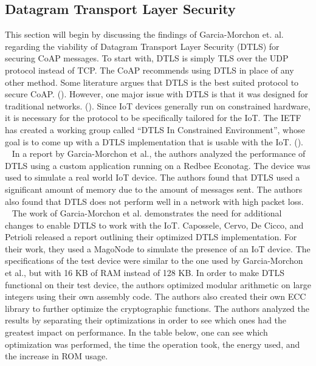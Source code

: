 \documentclass[letterpaper, 12pt]{article}
\begin{document}
\begin{flushleft}
\subsection*{Datagram Transport Layer Security}
This section will begin by discussing the findings of Garcia-Morchon et. al. regarding the viability of Datagram Transport Layer Security (DTLS)
for securing CoAP messages. To start with, DTLS is simply TLS over the UDP protocol instead of TCP. The CoAP recommends using DTLS in place of any
other method. Some literature argues that DTLS is the best suited protocol to secure CoAP. (\cite{Keoh6817545}). However, one major issue with DTLS is that it was designed for traditional networks. (\cite{Capossele}). 
Since IoT devices generally run on constrained hardware, it is necessary for the protocol to be specifically tailored for the IoT.
The IETF has created a working group called ``DTLS In Constrained Environment'', whose goal is to 
come up with a DTLS implementation that is usable with the IoT. (\cite{Keoh6817545}). \\
~\newline
In a report by Garcia-Morchon et al., the authors analyzed the performance of DTLS using a custom application running on a Redbee Econotag. The device
was used to simulate a real world IoT device. The authors found that DTLS used a significant amount of memory due to the amount of messages sent. 
The authors also found that DTLS does not perform well in a network with high packet loss. \\
~\newline
The work of Garcia-Morchon et al. demonstrates the need for additional changes to enable DTLS to work with the IoT. 
Capossele, Cervo, De Cicco,
and Petrioli released a report outlining their optimized DTLS implementation. For their work, they used a MagoNode to simulate the presence of an
IoT device. The specifications of the test device were similar to the one used by Garcia-Morchon et al., but with 16 KB of RAM instead of 128 KB.
In order to make DTLS functional on their test device, the authors optimized modular arithmetic on large integers using their own assembly code.
The authors also created their own ECC library to further optimize the cryptographic functions. The authors analyzed the results by separating their
optimizations in order to see which ones had the greatest impact on performance. In the table below, one can see which optimization was performed,
the time the operation took, the energy used, and the increase in ROM usage. 


\end{flushleft}
\end{document}
